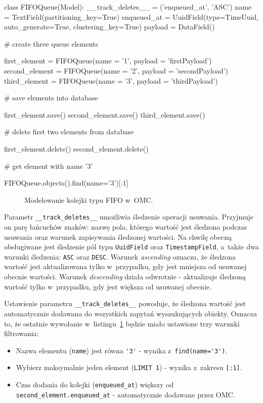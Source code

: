 \begin{verbbox}
class FIFOQueue(Model):
    __track_deletes__ = ('enqueued_at', 'ASC')
    name = TextField(partitioning_key=True)
    enqueued_at = UuidField(type=TimeUuid, 
                            auto_generate=True, 
                            clustering_key=True)
    payload = DataField()

# create three queue elements

first_element = FIFOQueue(name = '1', payload = 'firstPayload')
second_element = FIFOQueue(name = '2', payload = 'secondPayload')
third_element = FIFOQueue(name = '3', payload = 'thirdPayload')

# save elements into database

first_element.save()
second_element.save()
third_element.save()

# delete first two elements from database

first_element.delete()
second_element.delete()

# get element with name '3'

FIFOQueue.objects().find(name='3')[:1]
\end{verbbox}

\begin{figure}[ht!]
	\centering
	\theverbbox
	\caption{Modelowanie kolejki typu FIFO w~OMC.}
	\label{lst:fifo_queue_modeling}
\end{figure}

Parametr \verb+__track_deletes__+ umożliwia śledzenie operacji usuwania. Przyjmuje on parę łańcuchów znaków: nazwę pola, którego wartość jest śledzona podczas usuwania oraz warunek zapisywania śledzonej wartości. Na chwilę obecną obsługiwane jest śledzenie pól typu \verb+UuidField+ oraz \verb+TimestampField+, a~także dwa warunki śledzenia: \verb+ASC+ oraz \verb+DESC+. Warunek \emph{ascending} oznacza, że śledzona wartość jest aktualizowana tylko w~przypadku, gdy jest mniejsza od usuwanej obecnie wartości. Warunek \emph{descending} działa odwrotnie - aktualizuje śledzoną wartość tylko w~przypadku, gdy jest większa od usuwanej obecnie.

Ustawienie parametru \verb+__track_deletes__+ powoduje, że śledzona wartość jest automatycznie dodawana do wszystkich zapytań wyszukujących obiekty. Oznacza to, że ostatnie wywołanie w~listingu~\ref{lst:fifo_queue_modeling} będzie miało ustawione trzy warunki filtrowania:

\begin{itemize}
	\item Nazwa elementu (\verb+name+) jest równa \verb+'3'+ - wynika z~\verb+find(name='3')+.
	\item Wybierz maksymalnie jeden element (\verb+LIMIT 1+) - wynika z~zakresu \verb+[:1]+.
	\item Czas dodania do kolejki (\verb+enqueued_at+) większy od \verb+second_element.enqueued_at+ - automatycznie dodawane przez OMC.
\end{itemize}

